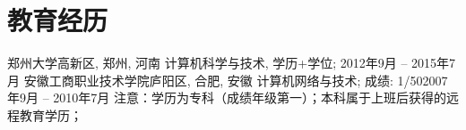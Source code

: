 \section{\textbf{教育经历}}
  \resumeSubHeadingListStart
    \resumeSubheading
      {郑州大学}{高新区, 郑州, 河南}
      {计算机科学与技术, 学历+学位; }{2012年9月 -- 2015年7月}
    \resumeSubheading
      {安徽工商职业技术学院}{庐阳区, 合肥, 安徽}
      {计算机网络与技术; 成绩: 1/50}{2007年9月 -- 2010年7月}
  \resumeSubHeadingListEnd
  \noindent\tiny 注意：学历为专科（成绩年级第一）；本科属于上班后获得的远程教育学历；
  \normalsize